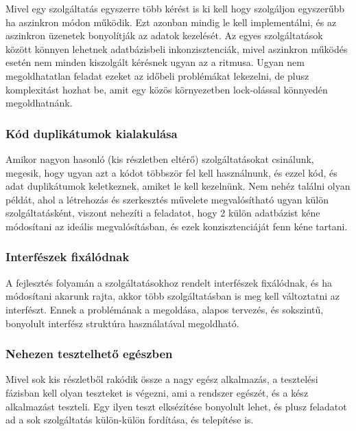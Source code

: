 \documentclass[11pt,magyar,a4paper,twoside,]{report}
\begin{document}
Mivel egy szolgáltatás egyszerre több kérést is ki kell hogy szolgáljon
egyszerűbb ha aszinkron módon működik. Ezt azonban mindig le kell
implementálni, és az aszinkron üzenetek bonyolítják az adatok kezelését.
Az egyes szolgáltatások között könnyen lehetnek adatbázisbeli
inkonzisztenciák, mivel aszinkron működés esetén nem minden kiszolgált
kérésnek ugyan az a ritmusa. Ugyan nem megoldhatatlan feladat ezeket az
időbeli problémákat lekezelni, de plusz komplexitást hozhat be, amit egy
közös környezetben lock-olással könnyedén megoldhatnánk.

\subsubsection{Kód duplikátumok
kialakulása}\label{kuxf3d-duplikuxe1tumok-kialakuluxe1sa}

Amikor nagyon hasonló (kis részletben eltérő) szolgáltatásokat
csinálunk, megesik, hogy ugyan azt a kódot többször fel kell
használnunk, és ezzel kód, és adat duplikátumok keletkeznek, amiket le
kell kezelnünk. Nem nehéz találni olyan példát, ahol a létrehozás és
szerkesztés művelete megvalósítható ugyan külön szolgáltatásként,
viszont nehezíti a feladatot, hogy 2 külön adatbázist kéne módosítani az
ideális megvalósításban, és ezek konzisztenciáját fenn kéne tartani.

\subsubsection{Interfészek
fixálódnak}\label{interfuxe9szek-fixuxe1luxf3dnak}

A fejlesztés folyamán a szolgáltatásokhoz rendelt interfészek
fixálódnak, és ha módosítani akarunk rajta, akkor több szolgáltatásban
is meg kell változtatni az interfészt. Ennek a problémának a megoldása,
alapos tervezés, és sokszintű, bonyolult interfész struktúra
használatával megoldható.

\subsubsection{Nehezen tesztelhető
egészben}\label{nehezen-tesztelhetux151-eguxe9szben}

Mivel sok kis részletből rakódik össze a nagy egész alkalmazás, a
tesztelési fázisban kell olyan teszteket is végezni, ami a rendszer
egészét, és a kész alkalmazást teszteli. Egy ilyen teszt elksézítése
bonyolult lehet, és plusz feladatot ad a sok szolgáltatás külön-külön
fordítása, és telepítése is.
\end{document}

